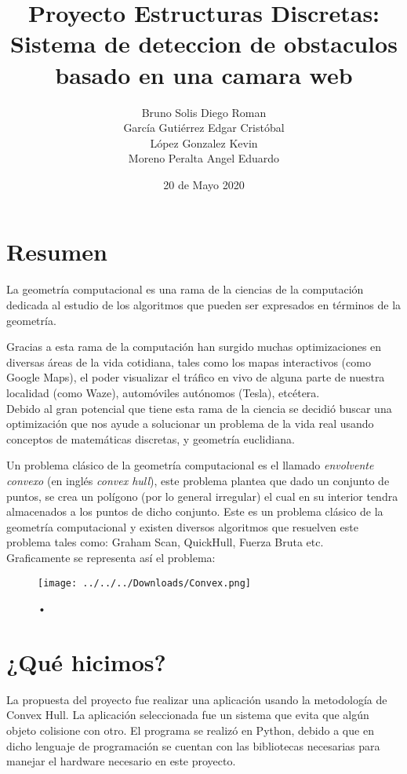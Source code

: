 \documentclass[]{article}
\title{Proyecto Estructuras Discretas: Sistema de deteccion de obstaculos basado en una camara web}
\author{Bruno Solis Diego Roman\\García Gutiérrez Edgar Cristóbal\\López Gonzalez Kevin\\Moreno Peralta Angel Eduardo }
\date{20 de Mayo 2020}
\begin{document}
\maketitle
\section{Resumen}
\large
La geometría computacional es una rama de la ciencias de la computación dedicada al estudio de los algoritmos que pueden ser expresados en términos de la geometría.

Gracias a esta rama de la computación han surgido muchas optimizaciones en diversas áreas de la vida cotidiana, tales como los mapas interactivos (como Google Maps), el poder visualizar el tráfico en vivo de alguna parte de nuestra localidad (como Waze), automóviles autónomos (Tesla), etcétera.\\
Debido al gran potencial que tiene esta rama de la ciencia se decidió buscar una optimización que nos ayude a solucionar un problema de la vida real usando conceptos de matemáticas discretas, y geometría euclidiana.

Un problema clásico de la geometría computacional es el llamado \textit{envolvente convexo} (en inglés \textit{convex hull}), este problema plantea que dado un conjunto de puntos, se crea un polígono (por lo general irregular) el cual en su interior tendra almacenados a los puntos de dicho conjunto. Este es un problema clásico de la geometría computacional y existen diversos algoritmos que resuelven este problema tales como: Graham Scan, QuickHull, Fuerza Bruta etc.\\
Graficamente se representa así el problema:\\\begin{figure}[hbtp]
\caption{•}
\centering
\texttt{[image: ../../../Downloads/Convex.png]}
\end{figure}



\section{¿Qué hicimos?}
La propuesta del proyecto fue realizar una aplicación usando la metodología de Convex Hull. La aplicación seleccionada fue un sistema que evita que algún objeto colisione con otro. El programa se realizó en Python, debido a que en dicho lenguaje de programación se cuentan con las bibliotecas necesarias para manejar el hardware necesario en este proyecto.
\end{document}
